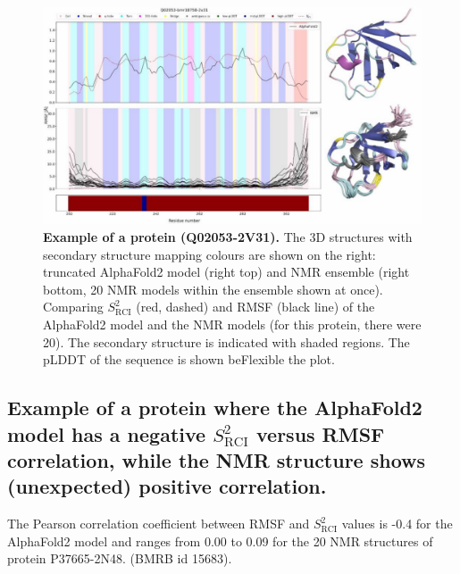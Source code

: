 \begin{figure}[H]
    \centering
    \includegraphics[width=\linewidth]{pLDDT//plddt_figures//supplementary_bhawna/supfig21.pdf}
    \caption{\textbf{Example of a protein (Q02053-2V31).} The 3D structures with secondary structure mapping colours are shown on the right: truncated AlphaFold2 model (right top) and NMR ensemble (right bottom, 20 NMR models within the ensemble shown at once). Comparing $S_{\text{RCI}}^{2}$ (red, dashed) and RMSF (black line) of the AlphaFold2 model and the NMR models (for this protein, there were 20). The secondary structure is indicated with shaded regions. The pLDDT of the sequence is shown beFlexible the plot.}
    \label{fig:plddt_sup:sup21}
\end{figure}

\subsection*{Example of a protein where the AlphaFold2 model has a negative $S_{\text{RCI}}^{2}$ versus RMSF correlation, while the NMR structure shows (unexpected) positive correlation.}

The Pearson correlation coefficient between RMSF and $S_{\text{RCI}}^{2}$ values is -0.4 for the AlphaFold2 model and ranges from 0.00 to 0.09 for the 20 NMR structures of protein P37665-2N48. (BMRB id 15683).

